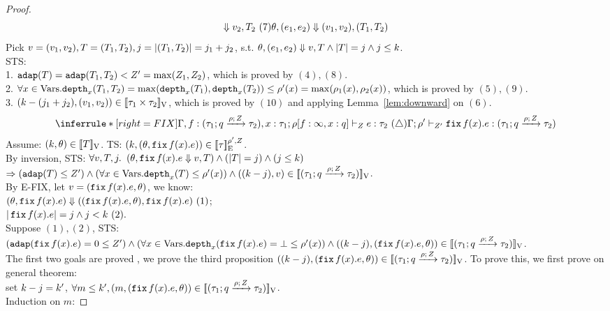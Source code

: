 \documentclass[a4paper,11pt]{article}
\theoremstyle{definition}
\begin{document}
\begin{proof}
\[{\mathrel{\Downarrow} v_2, T_2 ~ (7) }
{\theta, (e_1, e_2) \mathrel{\Downarrow} (v_1, v_2), (T_1, T_2)}
\]
Pick $v = (v_1, v_2), T = (T_1, T_2), j = |(T_1, T_2)| = j_1 + j_2$, s.t. $\theta, (e_1, e_2) \mathrel{\Downarrow} v, T \land |T| = j \land j \leq k$.\\
%
STS:\\
1. $\mathtt{adap}(T) = \mathtt{adap}(T_1, T_2) < Z' = \max(Z_1, Z_2)$, which is proved by $(4), (8)$.\\
%
2. $\forall x \in \mbox{Vars}. \mathtt{depth}_{x}(T_1, T_2) = \max(\mathtt{depth}_{x}(T_1), \mathtt{depth}_{x}(T_2)) \leq \rho'(x) = \max(\rho_1(x), \rho_2(x))$, which is proved by $(5),(9)$.\\
%
3. $(k - (j_1 + j_2), (v_1, v_2)) \in [\![ \tau_1
  \times \tau_2 ]\!]_{\text{V}}$, which is proved by $(10)
$ and applying Lemma~\ref{lem:downward} on $(6)$.\\


\[
    \inferrule*[right = FIX]{
      \Gamma, f: (\tarr{\type_1}{\type_2}{\nnatbiA}{\dmap}{\nnatA}), x: \type_1;
      \dmap[f: \infty, x: \nnatbiA]
      \tvdash{\nnatA}
      \expr: \type_2
       ~ (\triangle)
    }{
      \Gamma; \dmap' \tvdash{\nnatA'} \efix f(x).\expr: (\tarr{\type_1}{\type_2}{\nnatbiA}{\dmap}{\nnatA})
    }
\]
Assume: $(k, \theta) \in [\![ T ]\!]_{\text{V}}$. TS: $(k, (\theta, \mathop{\mathtt{fix}} f(x). e)) \in [\![ \tau ]\!]_{\text{E}}^{\rho', Z}$.\\
%
By inversion, STS: $\forall v, T, j.$
$(\theta, \mathop{\mathtt{fix}} f(x). e \mathrel{\Downarrow} v, T) \land (|T| = j) \land (j \leq k)$
$ \Rightarrow (\mathtt{adap}(T) \leq Z') \land (\forall x \in \mbox{Vars}. \mathtt{depth}_{x}(T) \leq \rho'(x)) \land ((k - j), v) \in [\![ (\tau_1; q \xrightarrow{\rho; \, Z} \tau_2) ]\!]_{\text{V}}$.\\
%
By E-FIX, let $v = (\mathop{\mathtt{fix}} f(x). e, \theta)$, we know:\\
$(\theta, \mathop{\mathtt{fix}} f(x). e) \mathrel{\Downarrow} ((\mathop{\mathtt{fix}} f(x). e, \theta), \mathop{\mathtt{fix}} f(x). e)~(1) $;\\
$|\mathop{\mathtt{fix}} f(x). e|= j \land j < k ~(2).$\\
%
Suppose $(1), (2)$, STS: $ (\mathtt{adap}(\mathop{\mathtt{fix}} f(x). e) = 0 \leq Z')
\land (\forall x \in \mbox{Vars}. \mathtt{depth}_{x}(\mathop{\mathtt{fix}} f(x). e) = \bot \leq \rho'(x)) \land ((k -j), (\mathop{\mathtt{fix}} f(x). e, \theta)) \in [\![ (\tau_1; q \xrightarrow{\rho; \, Z} \tau_2) ]\!]_{\text{V}}$.\\
%
The first two goals are proved , we prove the third proposition
$((k -j), (\mathop{\mathtt{fix}} f(x). e, \theta)) \in
[\![ (\tau_1; q \xrightarrow{\rho; \, Z} \tau_2) ]\!]_{\text{V}}$. To prove
this,  we first prove on general theorem: \\
set $k - j = k'$, $\forall m \leq k', (m, (\mathop{\mathtt{fix}} f(x). e, \theta)) \in [\![ (\tau_1; q \xrightarrow{\rho; \, Z} \tau_2) ]\!]_{\text{V}}$.\\
%
Induction on $m$:


\end{proof}
\end{document}
